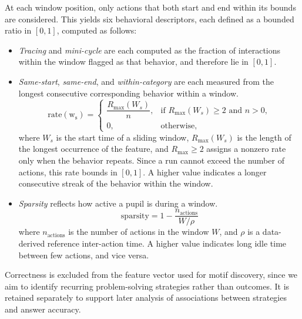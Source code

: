 \documentclass[letterpaper,journal]{IEEEtran}
\begin{document}
At each window position, only actions that both start and end within its bounds are considered. 
This yields six behavioral descriptors, each defined as a bounded ratio in $[0,1]$, computed as follows:

\begin{itemize}[nosep]
    \item
    \textit{Tracing} and \textit{mini-cycle} are each computed as the fraction of interactions within the window flagged as that behavior, and therefore lie in $[0,1]$.
    
    \item
    \textit{Same-start}, \textit{same-end}, and \textit{within-category} are each measured from the longest consecutive corresponding behavior within a window.
    \begin{equation}
        \operatorname{rate(w_s)}=
        \begin{cases}
        \dfrac{R_{\max}(W_s)}{n}, & \text{if } R_{\max}(W_s)\ge 2 \text{ and } n>0, \\[0.6em]
        0, & \text{otherwise,}
        \end{cases}
    \end{equation}
    where $W_s$ is the start time of a sliding window, $R_{\max}(W_s)$ is the length of the longest occurrence of the feature, and $R_{\max}\ge 2$ assigns a nonzero rate only when the behavior repeats. 
    Since a run cannot exceed the number of actions, this rate bounds in $[0,1]$.
    A higher value indicates a longer consecutive streak of the behavior within the window.
    
    \item
    \textit{Sparsity} reflects how active a pupil is during a window.
    \begin{equation}
        \mathrm{sparsity} = 1 - \frac{n_{\mathrm{actions}}}{W / \rho}
    \end{equation}
    where $n_{\mathrm{actions}}$ is the number of actions in the window $W$, and $\rho$ is a data-derived reference inter-action time.
    A higher value indicates long idle time between few actions, and vice versa.
\end{itemize}

Correctness is excluded from the feature vector used for motif discovery, since we aim to identify recurring problem-solving strategies rather than outcomes.
It is retained separately to support later analysis of associations between strategies and answer accuracy.
\end{document}
